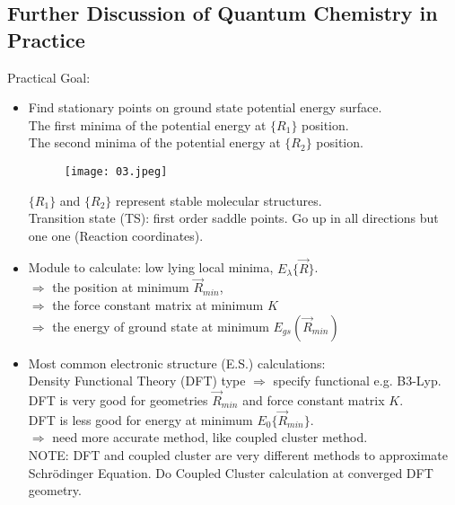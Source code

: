 \documentclass[a4paper, 12pt]{article}
\begin{document}
\subsection{Further Discussion of Quantum Chemistry in Practice}
Practical Goal:
\begin{itemize}
	\item Find stationary points on ground state potential energy surface.\\
\qquad The first minima of the potential energy at $\{R_1\}$ position.\\
\qquad The second minima of the potential energy at $\{R_2\}$ position.\\
	\begin{figure}[htp]
    \centering
    \texttt{[image: 03.jpeg]}
	\end{figure}
$\{R_1\}$ and $\{R_2\}$ represent stable molecular structures.\\
Transition state (TS): first order saddle points. Go up in all directions but one one (Reaction coordinates).
	\item Module to calculate: low lying local minima, $E_{\lambda}\{\vec{R}\}$.\\
$\Longrightarrow$ the position at minimum $\vec{R}_{min}$, \\
$\Longrightarrow$ the force constant matrix at minimum $K$\\
$\Longrightarrow$ the energy of ground state at minimum $E_{gs}(\vec{R}_{min})$
	\item Most common electronic structure (E.S.) calculations:\\
	Density Functional Theory (DFT) type $\Longrightarrow$ specify functional e.g. B3-Lyp.\\
	DFT is very good for geometries $\vec{R}_{min}$ and force constant matrix $K$.\\
	DFT is less good for energy at minimum $E_0\{\vec{R}_{min}\}$.\\
	$\Longrightarrow$ need more accurate method, like coupled cluster method.\\
	
	NOTE: DFT and coupled cluster are very different methods to approximate Schr\"{o}dinger Equation. Do Coupled Cluster calculation at converged DFT geometry.
	

\end{itemize}
\end{document}
